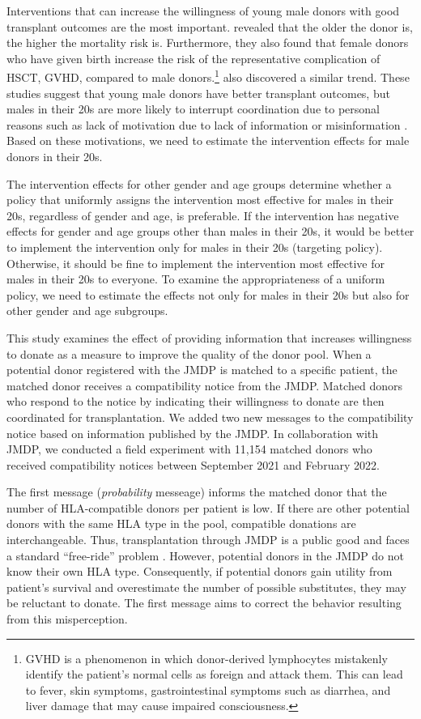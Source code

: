 \documentclass[12pt, a4paper]{article}
\begin{document}
Interventions that can increase the willingness of young male donors with good transplant outcomes are the most important. \citet{Kollman2016} revealed that the older the donor is, the higher the mortality risk is. Furthermore, they also found that female donors who have given birth increase the risk of the representative complication of HSCT, GVHD, compared to male donors.\footnote{GVHD is a phenomenon in which donor-derived lymphocytes mistakenly identify the patient's normal cells as foreign and attack them. This can lead to fever, skin symptoms, gastrointestinal symptoms such as diarrhea, and liver damage that may cause impaired consciousness.} \citet{Loren2006} also discovered a similar trend. These studies suggest that young male donors have better transplant outcomes, but males in their 20s are more likely to interrupt coordination due to personal reasons such as lack of motivation due to lack of information or misinformation \citep{Hirakawa2018, Kurosawa2022}. Based on these motivations, we need to estimate the intervention effects for male donors in their 20s.

The intervention effects for other gender and age groups determine whether a policy that uniformly assigns the intervention most effective for males in their 20s, regardless of gender and age, is preferable. If the intervention has negative effects for gender and age groups other than males in their 20s, it would be better to implement the intervention only for males in their 20s (targeting policy). Otherwise, it should be fine to implement the intervention most effective for males in their 20s to everyone. To examine the appropriateness of a uniform policy, we need to estimate the effects not only for males in their 20s but also for other gender and age subgroups.

This study examines the effect of providing information that increases willingness to donate as a measure to improve the quality of the donor pool. When a potential donor registered with the JMDP is matched to a specific patient, the matched donor receives a compatibility notice from the JMDP. Matched donors who respond to the notice by indicating their willingness to donate are then coordinated for transplantation. We added two new messages to the compatibility notice based on information published by the JMDP. In collaboration with JMDP, we conducted a field experiment with 11,154 matched donors who received compatibility notices between September 2021 and February 2022.

The first message (\emph{probability} messeage) informs the matched donor that the number of HLA-compatible donors per patient is low. If there are other potential donors with the same HLA type in the pool, compatible donations are interchangeable. Thus, transplantation through JMDP is a public good and faces a standard ``free-ride'' problem \citep{Bergstrom2009}. However, potential donors in the JMDP do not know their own HLA type. Consequently, if potential donors gain utility from patient's survival and overestimate the number of possible substitutes, they may be reluctant to donate. The first message aims to correct the behavior resulting from this misperception.
\end{document}
